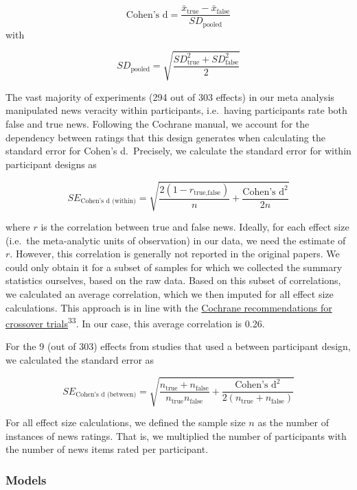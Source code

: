 \documentclass[
  man]{apa6}
\begin{document}
\[
\text{Cohen's d} = \frac{\bar{x}_{\text{true}} - \bar{x}_{\text{false}}}{SD_{\text{pooled}}}
\] with

\[
SD_{\text{pooled}} = \sqrt{\frac{SD_{\text{true}}^2+SD_{\text{false}}^2}{2}}
\]

The vast majority of experiments (294 out of 303 effects) in our meta analysis manipulated news veracity within participants, i.e.~having participants rate both false and true news. Following the Cochrane manual, we account for the dependency between ratings that this design generates when calculating the standard error for Cohen's d.~Precisely, we calculate the standard error for within participant designs as

\[
SE_{\text{Cohen's d (within)}} = \sqrt{\frac{2(1-r_{\text{true},\text{false}})}{n}+\frac{\text{Cohen's d}^2}{2n}}
\]

where \(r\) is the correlation between true and false news. Ideally, for each effect size (i.e.~the meta-analytic units of observation) in our data, we need the estimate of \(r\). However, this correlation is generally not reported in the original papers. We could only obtain it for a subset of samples for which we collected the summary statistics ourselves, based on the raw data. Based on this subset of correlations, we calculated an average correlation, which we then imputed for all effect size calculations. This approach is in line with the \href{https://training.cochrane.org/handbook/current/chapter-23\#section-23-2-7-3}{Cochrane recommendations for crossover trials}\textsuperscript{33}. In our case, this average correlation is 0.26.

For the 9 (out of 303) effects from studies that used a between participant design, we calculated the standard error as

\[
SE_{\text{Cohen's d (between)}} = \sqrt{\frac{n_{\text{true}}+n_{\text{false}}}{n_{\text{true}}n_{\text{false}}}+\frac{\text{Cohen's d}^2}{2(n_{\text{true}}+n_{\text{false}})}}
\]

For all effect size calculations, we defined the sample size \(n\) as the number of instances of news ratings. That is, we multiplied the number of participants with the number of news items rated per participant.

\subsubsection{Models}\label{models}
\end{document}
